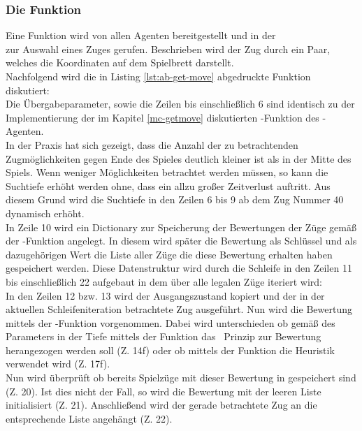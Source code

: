 \subsubsection{Die Funktion }
Eine Funktion  wird von allen Agenten bereitgestellt und in der \\ zur Auswahl eines Zuges gerufen. Beschrieben wird der Zug durch ein Paar, welches die Koordinaten auf dem Spielbrett darstellt.
\\Nachfolgend wird die in Listing \ref{lst:ab-get-move} abgedruckte Funktion diskutiert:
\\Die Übergabeparameter, sowie die Zeilen bis einschließlich 6 sind identisch zu der Implementierung der im Kapitel \ref{mc-getmove} diskutierten -Funktion des \mxZitat{\mc}-Agenten.
\\In der Praxis hat sich gezeigt, dass die Anzahl der zu betrachtenden Zugmöglichkeiten gegen Ende des Spieles deutlich kleiner ist als in der Mitte des Spiels. Wenn weniger Möglichkeiten betrachtet werden müssen, so kann die Suchtiefe erhöht werden ohne, dass ein allzu großer Zeitverlust auftritt. Aus diesem Grund wird die Suchtiefe in den Zeilen 6 bis 9 ab dem Zug Nummer 40 dynamisch erhöht.
\\In Zeile 10 wird ein Dictionary zur Speicherung der Bewertungen der Züge gemäß der -Funktion angelegt. In diesem wird später die Bewertung als Schlüssel und als dazugehörigen Wert die Liste aller Züge die diese Bewertung erhalten haben gespeichert werden. Diese Datenstruktur wird durch die Schleife in den Zeilen 11 bis einschließlich 22 aufgebaut in dem über alle legalen Züge iteriert wird:
\\In den Zeilen 12 bzw. 13 wird der Ausgangszustand kopiert und der in der aktuellen Schleifeniteration betrachtete Zug  ausgeführt. Nun wird die Bewertung mittels der -Funktion vorgenommen. Dabei wird unterschieden ob gemäß des Parameters  in der Tiefe  mittels der Funktion  das \mc\ Prinzip zur Bewertung herangezogen werden soll (Z. 14f) oder ob mittels der Funktion  die Heuristik verwendet wird (Z. 17f).
\\Nun wird überprüft ob bereits Spielzüge mit dieser Bewertung in  gespeichert sind (Z. 20). Ist dies nicht der Fall, so wird die Bewertung mit der leeren Liste initialisiert (Z. 21). Anschließend wird der gerade betrachtete Zug  an die entsprechende Liste angehängt (Z. 22).
